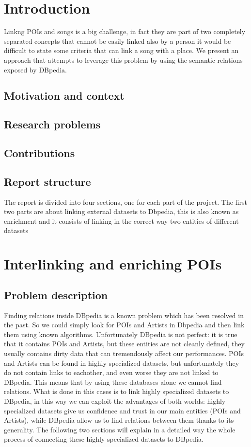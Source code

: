 \section{Introduction}
Linkng POIs and songs is a big challenge, in fact they are part of two completely separated concepts that cannot be easily linked also by a person it would be difficult to state some criteria that can link a song with a place. We present an approach that attempts to leverage this problem by using the semantic relations exposed by DBpedia.
\subsection{Motivation and context}

\subsection{Research problems}

\subsection{Contributions}

\subsection{Report structure}
The report is divided into four sections, one for each part of the project. The first two parts are about linking external datasets to Dbpedia, this is also known as enrichment and it consists of linking in the correct way two entities of different datasets
\section{Interlinking and enriching POIs}

\subsection{Problem description}
Finding relations inside DBpedia is a known problem which has been resolved in the past. So we could simply look for POIs and Artists in Dbpedia and then link them using known algorithms.
Unfortunately DBpedia is not perfect: it is true that it contains POIs and Artists, but these entities are not cleanly defined, they usually contains dirty data that can tremendously affect our performances.
POIs and Artists can be found in highly specialized datasets, but unfortunately they do not contain links to eachother, and even worse they are not linked to DBpedia. This means that by using these databases alone we cannot find relations.
What is done in this cases is to link highly specialized datasets to DBpedia, in this way we can exploit the advantages of both worlds: highly specialized datasets give us confidence and trust in our main entities (POIs and Artists), while DBpedia allow us to find relations between them thanks to its generality.
The following two sections will explain in a detailed way the whole process of connecting these highly specialized datasets to DBpedia.

